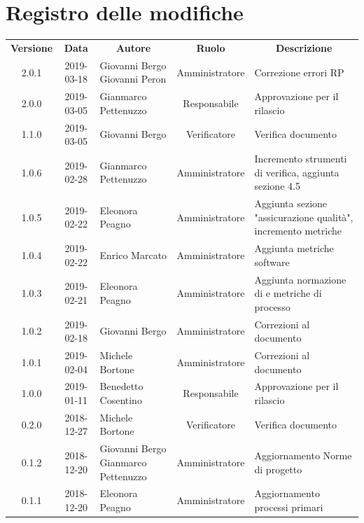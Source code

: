\documentclass[11pt,a4paper]{article}
\begin{document}
	
	
	{\def\arraystretch{2}\tabcolsep=10pt
	\newpage
	\section*{\centering Registro delle modifiche}
	\begin{tabularx}{\textwidth}{ c | c | p{3.80cm} | c | X }
		\rowcolor{LightBlue}
		\color{white}\bfseries Versione & \color{white}\bfseries Data & \multicolumn{1}{c}{\color{white}\bfseries Autore}
		& \color{white}\bfseries Ruolo & \multicolumn{1}{c}{\color{white}\bfseries Descrizione}\\[0.25cm]
		2.0.1 & 2019-03-18 & Giovanni Bergo \newline Giovanni Peron & Amministratore & Correzione errori RP \\ \hline
		2.0.0 & 2019-03-05 & Gianmarco Pettenuzzo & Responsabile & Approvazione per il rilascio \\ \hline
		1.1.0 & 2019-03-05 & Giovanni Bergo & Verificatore & Verifica documento \\ \hline
		1.0.6 & 2019-02-28 & Gianmarco Pettenuzzo & Amministratore & Incremento strumenti di verifica, aggiunta sezione 4.5 \\ \hline
		1.0.5 & 2019-02-22 & Eleonora Peagno & Amministratore & Aggiunta sezione "assicurazione qualità", incremento metriche \\ \hline
		1.0.4 & 2019-02-22 & Enrico Marcato & Amministratore & Aggiunta metriche software \\ \hline
		1.0.3 & 2019-02-21 & Eleonora Peagno & Amministratore & Aggiunta normazione di e metriche di processo \\ \hline
		1.0.2 & 2019-02-18 & Giovanni Bergo & Amministratore & Correzioni al documento \\ \hline
		1.0.1 & 2019-02-04 & Michele Bortone & Amministratore & Correzioni al documento \\ \hline
		1.0.0 & 2019-01-11 & Benedetto Cosentino & Responsabile & Approvazione per il rilascio \\ \hline
		0.2.0 & 2018-12-27 & Michele Bortone & Verificatore & Verifica documento \\ \hline
		0.1.2 & 2018-12-20 & Giovanni Bergo \newline Gianmarco Pettenuzzo & Amministratore & Aggiornamento Norme di progetto \\ \hline
		0.1.1 & 2018-12-20 & Eleonora Peagno & Amministratore & Aggiornamento processi primari \\ \hline

\end{tabularx}}
\end{document}
